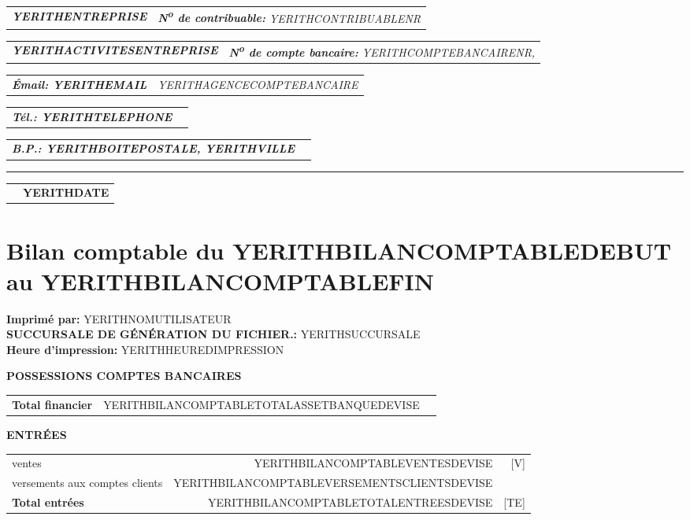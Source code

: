\documentclass[10pt,YERITHPAPERSPEC,landscape]{article} %
\makeatletter
\newcommand{\headerrow}[2]
{\begin{tabular*}{\linewidth}{l@{\extracolsep{\fill}}r}
	#1 &
	#2 \\
\end{tabular*}}
\newcommand{\emphbold}[1]{\textbf{\emph{#1}}\xspace}
\makeatother
\begin{document}
\bigskip

\headerrow
	{\emphbold{YERITHENTREPRISE}}
	{\emph{\textbf{N\textsuperscript{o} de contribuable:} YERITHCONTRIBUABLENR}}
\headerrow
	{\emphbold{YERITHACTIVITESENTREPRISE}}
	{\emph{\textbf{N\textsuperscript{o} de compte bancaire:} YERITHCOMPTEBANCAIRENR,}}
\headerrow
	{\emphbold{\'Email: YERITHEMAIL}}
	{\emph{YERITHAGENCECOMPTEBANCAIRE}}
\headerrow
	{\emphbold{T\'el.: YERITHTELEPHONE}}
	{}
\headerrow
	{\emphbold{B.P.: YERITHBOITEPOSTALE, YERITHVILLE}}
	{}
	
\hrule

\headerrow
	{}
	{\textbf{YERITHDATE}}

\section*{Bilan comptable du YERITHBILANCOMPTABLEDEBUT au YERITHBILANCOMPTABLEFIN}

\textbf{Imprim\'e par:} YERITHNOMUTILISATEUR\\
\textbf{SUCCURSALE DE GÉNÉRATION DU FICHIER.:} YERITHSUCCURSALE\\
\textbf{Heure d'impression:} YERITHHEUREDIMPRESSION\\

\vspace*{0.15em}

\textbf{POSSESSIONS COMPTES BANCAIRES}
\begin{table}[!htbp]
\begin{tabular}{lrr}
\textbf{Total financier}  	&  YERITHBILANCOMPTABLETOTALASSETBANQUEDEVISE 	&  \\	 
\end{tabular}
\end{table}


\vspace*{0.15em}
\textbf{ENTR\'EES}
\begin{table}[!htbp]
\begin{tabular}{lrr}
ventes  						&  YERITHBILANCOMPTABLEVENTESDEVISE  			& [V] \\ 
versements aux comptes clients  &  YERITHBILANCOMPTABLEVERSEMENTSCLIENTSDEVISE  & \\ \hline
\textbf{Total entr\'ees}  		&  YERITHBILANCOMPTABLETOTALENTREESDEVISE & [TE] 		\\ 
\end{tabular}
\end{table}
\end{document}
